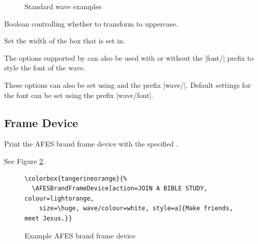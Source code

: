 \documentclass[a4paper]{l3doc}
\begin{document}
\begin{description}
\begin{figure}
      \centering
      \quad
      \quad
      \caption{Standard wave examples}\label{standwaves}
    \end{figure}

  \item[uppercase] Boolean controlling whether to transform  to
    uppercase.
  \item[width] Set the width of the box that  is set in.
\end{description}

The options supported by  can also be used with or
without the |font/| prefix to style the font of the wave.

These options can also be set using  and the prefix
|wave/|. Default settings for the font can be set using the prefix
|wave/font|.

\subsection{Frame Device}

\begin{function}{\AFESBrandFrameDevice}
  \begin{syntax}
  \end{syntax}
  Print the AFES brand frame device with the specified .
\end{function}

See Figure \ref{framedevice}.

\begin{figure}
  \begin{lstlisting}
\colorbox{tangerineorange}{%
  \AFESBrandFrameDevice[action=JOIN A BIBLE STUDY, colour=lightorange,
    size=\huge, wave/colour=white, style=a]{Make friends, meet Jesus.}}
  \end{lstlisting}

  {\centering\setlength{\fboxsep}{5mm}%
     \colorbox{tangerineorange}{%
       }\par}
  \caption{Example AFES brand frame device}\label{framedevice}
\end{figure}
\end{document}
